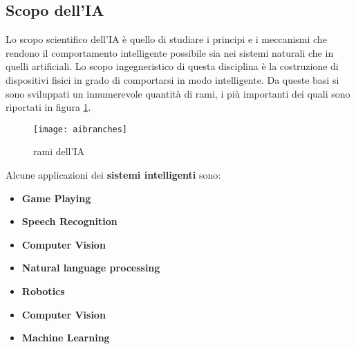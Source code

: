 \subsection{Scopo dell'IA}
Lo scopo scientifico  dell'IA è quello di studiare i principi e i meccanismi che rendono il comportamento intelligente possibile sia
nei sistemi naturali che in quelli artificiali. Lo scopo ingegneristico di questa disciplina è la costruzione di dispositivi fisici
in grado di comportarsi in modo intelligente. Da queste basi si sono sviluppati un innumerevole quantità di rami, i più importanti dei quali 
sono riportati in figura \ref{fig:branches}.
\begin{figure}
  \texttt{[image: aibranches]}
  \caption{rami dell'IA}
  \label{fig:branches}
\end{figure}
Alcune applicazioni dei \textbf{sistemi intelligenti} sono:
\begin{itemize}
  \item  \textbf{Game Playing}
  \item  \textbf{Speech Recognition}
  \item  \textbf{Computer Vision}
  \item \textbf{Natural language processing}
  \item \textbf{Robotics}
  \item \textbf{Computer Vision}
  \item \textbf{Machine Learning}
  \end{itemize}






